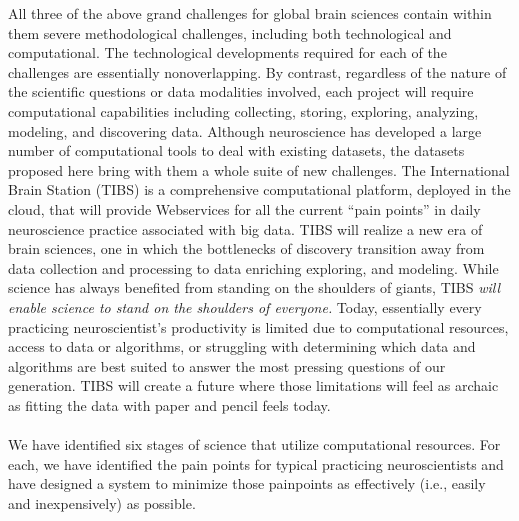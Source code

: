 \documentclass{amsart}
\begin{document}
All three of the above grand challenges for global brain sciences
contain within them severe methodological challenges, including both
technological and computational. The technological developments required
for each of the challenges are essentially non­overlapping. By contrast,
regardless of the nature of the scientific questions or data modalities
involved, each project will require computational capabilities including
collecting, storing, exploring, analyzing, modeling, and discovering
data. Although neuroscience has developed a large number of
computational tools to deal with existing datasets, the datasets
proposed here bring with them a whole suite of new challenges.
The International Brain Station (TIBS) is a comprehensive computational
platform, deployed in the cloud, that will provide Web­services for all
the current ``pain points'' in daily neuroscience practice associated with
big data. TIBS will realize a new era of brain sciences, one in which
the bottlenecks of discovery transition away from data collection and
processing to data enriching
exploring, and modeling. While science has always benefited from
standing on the shoulders of giants, TIBS \textit{will enable science to stand
on the shoulders of everyone.}  Today, essentially every practicing
neuroscientist’s productivity is limited due to computational resources,
access to data or algorithms, or struggling with determining which data
and algorithms are best suited to answer the most pressing questions of
our generation. TIBS will create a future where those limitations will
feel as archaic as fitting the data with paper and pencil feels today.
\\ \\ 


We have identified six stages of science that utilize computational
resources. For each, we have identified the pain points for typical
practicing neuroscientists and have designed a system to minimize those
pain­points as effectively (i.e., easily and inexpensively) as possible.
\end{document}
